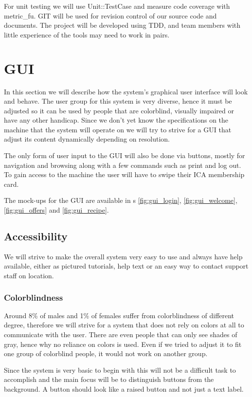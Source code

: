 \documentclass[a4paper,twoside,titlepage]{article}
\begin{document}
		For unit testing we will use Unit::TestCase and measure code coverage with metric\_fu. GIT will be used for revision control of our source code and documents.
		The project will be developed using TDD, and team members with little experience of the tools may need to work in pairs.
\section{GUI}

	In this section we will describe how the system's graphical user interface will look and behave. The user group for this system is very diverse, hence it must be adjusted so it can be used by people that are colorblind, visually impaired or have any other handicap. Since we don't yet know the specifications on the machine that the system will operate on we will try to strive for a GUI that adjust its content dynamically depending on resolution. 

	The only form of user input to the GUI will also be done via buttons, mostly for navigation and browsing along with a few commands such as print and log out. To gain access to the machine the user will have to swipe their ICA membership card. 
	
	The mock-ups for the GUI are available in \figurename{}s \ref{fig:gui_login}, \ref{fig:gui_welcome}, \ref{fig:gui_offers} and \ref{fig:gui_recipe}.

	\subsection{Accessibility}
		We will strive to make the overall system very easy to use and always have help available, either as pictured tutorials, help text or an easy way to contact support staff on location.

		\subsubsection{Colorblindness}
			Around 8\% of males and 1\% of females suffer from colorblindness of different degree, therefore we will strive for a system that does not rely on colors at all to communicate with the user. There are even people that can only see shades of gray, hence why no reliance on colors is used. Even if we tried to adjust it to fit one group of colorblind people, it would not work on another group.

 			Since the system is very basic to begin with this will not be a difficult task to accomplish and the main focus will be to distinguish buttons from the background. A button should look like a raised button and not just a text label.
\end{document}
